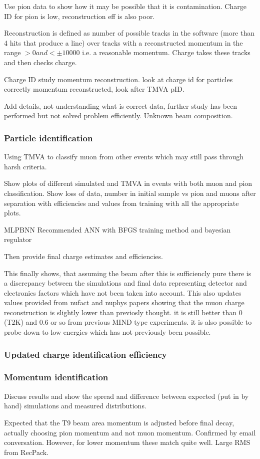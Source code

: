 Use pion data to show how it may be possible that it is contamination. Charge ID for pion is low, reconstruction eff is also poor.

Reconstruction is defined as number of possible tracks in the software (more than 4 hits that produce a line) over tracks with a reconstructed momentum in the range $>0 and <\pm 10000$ i.e. a reasonable momentum. Charge takes these tracks and then checks charge.

Charge ID study momentum reconstruction. look at charge id for particles correctly momentum reconstructed, look after TMVA pID. 


Add details, not understanding what is correct data, further study has been performed but not solved problem efficiently. Unknown beam composition.


\subsubsection{Particle identification}

Using TMVA to classify muon from other events which may still pass through harsh criteria. 

Show plots of different simulated and TMVA in events with both muon and pion classification. Show loss of data, number in initial sample vs pion and muons after separation with efficiencies and values from training with all the appropriate plots. 

MLPBNN Recommended ANN with BFGS training method and bayesian regulator

Then provide final charge estimates and efficiencies.

This finally shows, that assuming the beam after this is sufficiencly pure there is a discrepancy between the simulations and final data representing detector and electronics factors which have not been taken into account. This also updates values provided from nufact and nuphys papers showing that the muon charge reconstruction is slightly lower than previosly thought. it is still better than 0 (T2K) and 0.6 or so from previous MIND type experiments. it is also possible to probe down to low energies which has not previously been possible.

\subsubsection{Updated charge identification efficiency}

\subsubsection{Momentum identification}
Discuss results and show the spread and difference between expected (put in by hand) simulations and measured distributions. 

Expected that the T9 beam area momentum is adjusted before final decay, actually choosing pion momentum and not muon momentum. Confirmed by email conversation. However, for lower momentum these match quite well. Large RMS from RecPack.



